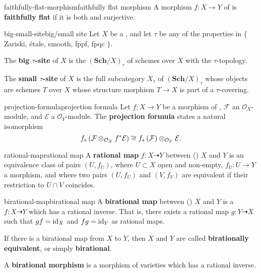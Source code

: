 \begin{topic}{faithfully-flat-morphism}{faithfully flat morphism}
    A morphism $f : X \to Y$ of  is \textbf{faithfully flat} if it is both  and surjective.
\end{topic}

\begin{topic}{big-small-site}{big/small site}
    Let $X$ be a , and let $\tau$ be any of the properties in $\{$ Zariski, étale, smooth, fppf, fpqc $\}$.
    
    The \textbf{big $\tau$-site} of $X$ is the  $(\textbf{Sch}/X)_\tau$ of schemes over $X$ with the $\tau$-topology.
    
    The \textbf{small $\tau$-site} of $X$ is the full subcategory $X_\tau$ of $(\textbf{Sch}/X)_\tau$ whose objects are schemes $T$ over $X$ whose structure morphism $T \to X$ is part of a $\tau$-covering.
\end{topic}

\begin{topic}{projection-formula}{projection formula}
    Let $f : X \to Y$ be a morphism of , $\mathcal{F}$ an $\mathcal{O}_X$-module, and $\mathcal{E}$ a  $\mathcal{O}_Y$-module. The \textbf{projection formula} states a natural isomorphism
    \[ f_*\left(\mathcal{F} \otimes_{\mathcal{O}_X} f^* \mathcal{E} \right) \cong f_*\left(\mathcal{F}\right) \otimes_{\mathcal{O}_Y} \mathcal{E} . \]
\end{topic}

\begin{topic}{rational-map}{rational map}
    A \textbf{rational map} $f : X \dashrightarrow Y$ between ()  $X$ and $Y$ is an equivalence class of pairs $(U, f_U)$, where $U \subset X$ open and non-empty, $f_U : U \to Y$ a morphism, and where two pairs $(U, f_U)$ and $(V, f_V)$ are equivalent if their restriction to $U \cap V$ coincides.
\end{topic}

\begin{topic}{birational-map}{birational map}
    A \textbf{birational map} between ()  $X$ and $Y$ is a  $f : X \dashrightarrow Y$ which has a rational inverse. That is, there exists a rational map $g : Y \dashrightarrow X$ such that $gf = \textup{id}_X$ and $fg = \textup{id}_Y$ as rational maps.
    
    If there is a birational map from $X$ to $Y$, then $X$ and $Y$ are called \textbf{birationally equivalent}, or simply \textbf{birational}.
    
    A \textbf{birational morphism} is a morphism of varieties which has a rational inverse.
\end{topic}

